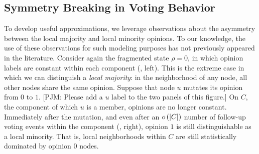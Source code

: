 \documentclass[review, onefignum, onetabnum]{siamart171218}
\newcommand{\pjm}[1]{{\color{blue}[PJM: #1]}}
\begin{document}
		
	\subsection{Symmetry Breaking in Voting Behavior}
		To develop useful approximations, we leverage observations about the asymmetry between the local majority and local minority opinions. To our knowledge, the use of these observations for such modeling purposes has not previously appeared in the literature.
		Consider again the fragmented state $\rho = 0$, in which opinion labels are constant within each component (, left).  
		This is the extreme case in which we can distinguish a \emph{local majority}: in the neighborhood of any node, all other nodes share the same opinion. 
		Suppose that node $u$ mutates its opinion from $0$ to $1$. \pjm{Please add a $u$ label to the two panels of this figure.}
		On $C$, the component of which $u$ is a member, opinions are no longer constant.	
		Immediately after the mutation, and even after an $o\left(\left|C\right|\right)$ number of follow-up voting events within the component (, right), opinion $1$ is still distinguishable as a local minority. That is, local neighborhoods within $C$ are still statistically dominated by opinion $0$ nodes. 
        
\end{document}
